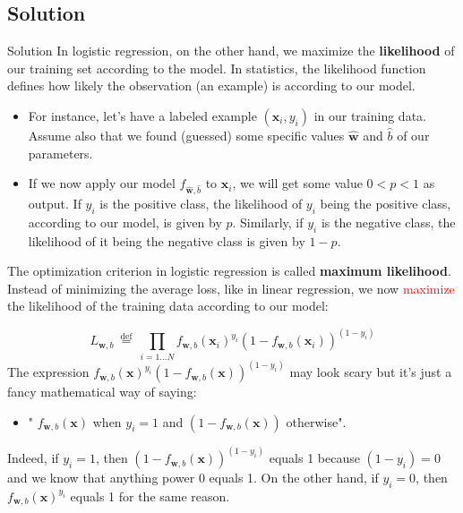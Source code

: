 \documentclass[9pt,dvipsnames]{beamer}
\begin{document}
\subsection{Solution}
\begin{frame}{Solution}
	In logistic regression, on the other hand, we maximize the \textbf{likelihood} of our training set according to the model. In statistics, the likelihood function defines how likely the observation (an example) is according to our model.
	\begin{itemize}
		\item For instance, let's have a labeled example $\left(\mathbf{x}_{i}, y_{i}\right)$ in our training data. Assume also that we found (guessed) some specific values $\hat{\mathbf{w}}$ and $\hat{b}$ of our parameters. 
		\item If we now apply our model $f_{\hat{\mathbf{w}}, \hat{b}}$ to $\mathbf{x}_{i}$, we will get some value $0<p<1$ as output. If $y_{i}$ is the positive class, the likelihood of $y_{i}$ being the positive class, according to our model, is given by $p$. Similarly, if $y_{i}$ is the negative class, the likelihood of it being the negative class is given by $1-p$.
	\end{itemize}
\end{frame}

\begin{frame}
	The optimization criterion in logistic regression is called \textbf{maximum likelihood}. Instead of minimizing the average loss, like in linear regression, we now \textcolor{red}{maximize} the likelihood of the training data according to our model:
	
	$$
	L_{\mathbf{w}, b} \stackrel{\text { def }}{=} \prod_{i=1 \ldots N} f_{\mathbf{w}, b}\left(\mathbf{x}_{i}\right)^{y_{i}}\left(1-f_{\mathbf{w}, b}\left(\mathbf{x}_{i}\right)\right)^{\left(1-y_{i}\right)}
	$$
	The expression $f_{\mathbf{w}, b}(\mathbf{x})^{y_{i}}\left(1-f_{\mathbf{w}, b}(\mathbf{x})\right)^{\left(1-y_{i}\right)}$ may look scary but it's just a fancy mathematical way of saying: 
	
	\begin{itemize}
		\item " $f_{\mathbf{w}, b}(\mathbf{x})$ when $y_{i}=1$ and $\left(1-f_{\mathbf{w}, b}(\mathbf{x})\right)$ otherwise".
	\end{itemize}
	 Indeed, if $y_{i}=1$, then 
	$\left(1-f_{\mathbf{w}, b}(\mathbf{x})\right)^{\left(1-y_{i}\right)}$ equals 1 because $\left(1-y_{i}\right)=0$ and we know that anything power 0 equals 1. On the other hand, if $y_{i}=0$, then $f_{\mathbf{w}, b}(\mathbf{x})^{y_{i}}$ equals 1 for the same reason.
\end{frame}
\end{document}
